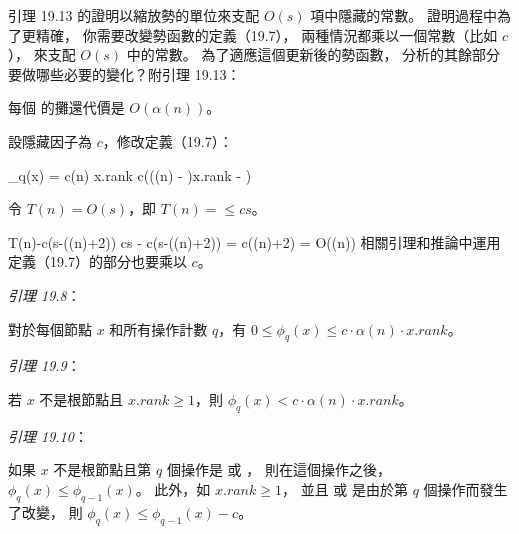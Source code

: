 \startEXERCISE\DIFFICULT
引理 19.13 的證明以縮放勢的單位來支配 $O(s)$ 項中隱藏的常數。
證明過程中為了更精確，
你需要改變勢函數的定義（19.7），
兩種情況都乘以一個常數（比如 $c$），
來支配 $O(s)$ 中的常數。
為了適應這個更新後的勢函數，
分析的其餘部分要做哪些必要的變化？附引理 19.13：

每個  的攤還代價是 $O(\alpha(n))$。
\stopEXERCISE

\startANSWER
設隱藏因子為 $c$，修改定義（19.7）：

\startformula[x]
\phi_q(x) =\startmathcases
\NC c\cdot \alpha(n) \cdot x.rank \NC {} \NR
\NC c\cdot \left(\left(\alpha(n) - \right)\cdot x.rank - \right) \NC {} \NR
\stopmathcases\stopformula

令 $T(n)=O(s)$，即 $T(n)=\le cs$。

\startformula\startmathalignment
\NC T(n)-c(s-(\alpha(n)+2)) \NC \le cs - c(s-(\alpha(n)+2)) \NR
\NC \NC = c(\alpha(n)+2) \NR
\NC \NC = O(\alpha(n)) \NR
\stopmathalignment\stopformula
相關引理和推論中運用定義（19.7）的部分也要乘以 $c$。

\noindentation\emph{引理 19.8}：

對於每個節點 $x$ 和所有操作計數 $q$，有 $0\le \phi_q(x)\le c\cdot \alpha(n)\cdot x.rank$。

\noindentation\emph{引理 19.9}：

若 $x$ 不是根節點且 $x.rank \ge 1$，則 $\phi_q(x) < c \cdot \alpha(n) \cdot x.rank$。

\noindentation\emph{引理 19.10}：

如果 $x$ 不是根節點且第 $q$ 個操作是  或 ，
則在這個操作之後， $\phi_q(x)\le \phi_{q-1}(x)$。
此外，如 $x.rank\ge 1$，
並且  或  是由於第 $q$ 個操作而發生了改變，
則 $\phi_q(x)\le \phi_{q-1}(x) - c$。

\stopANSWER
